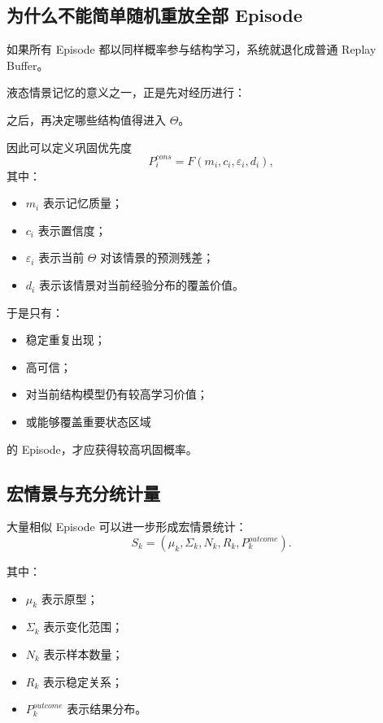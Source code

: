 \subsection{为什么不能简单随机重放全部 Episode}

如果所有 Episode 都以同样概率参与结构学习，系统就退化成普通 Replay Buffer。

液态情景记忆的意义之一，正是先对经历进行：
\begin{statementbox}
\centering
{}
\end{statementbox}
之后，再决定哪些结构值得进入 $\Theta$。

因此可以定义巩固优先度
\[
\boxed{
P_i^{cons}
=
F
\left(
m_i,
c_i,
\varepsilon_i,
d_i
\right),
}
\]
其中：

\begin{itemize}
    \item $m_i$ 表示记忆质量；
    \item $c_i$ 表示置信度；
    \item $\varepsilon_i$ 表示当前 $\Theta$ 对该情景的预测残差；
    \item $d_i$ 表示该情景对当前经验分布的覆盖价值。
\end{itemize}

于是只有：

\begin{itemize}
    \item 稳定重复出现；
    \item 高可信；
    \item 对当前结构模型仍有较高学习价值；
    \item 或能够覆盖重要状态区域
\end{itemize}

的 Episode，才应获得较高巩固概率。

\subsection{宏情景与充分统计量}

大量相似 Episode 可以进一步形成宏情景统计：
\[
\boxed{
S_k
=
(
\mu_k,
\Sigma_k,
N_k,
R_k,
P_k^{outcome}
).
}
\]

其中：

\begin{itemize}
    \item $\mu_k$ 表示原型；
    \item $\Sigma_k$ 表示变化范围；
    \item $N_k$ 表示样本数量；
    \item $R_k$ 表示稳定关系；
    \item $P_k^{outcome}$ 表示结果分布。
\end{itemize}

